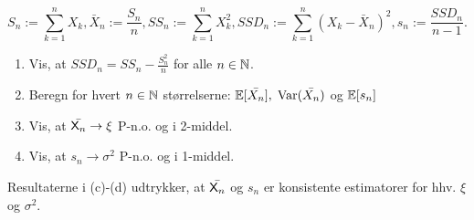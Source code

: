 \documentclass{Class}
\begin{document}
$$
S_n:=\sum_{k=1}^n X_k, \bar{X}_n:=\frac{S_n}{n}, S S_n:=\sum_{k=1}^n X_k^2, S S D_n:=\sum_{k=1}^n\left(X_k-\bar{X}_n\right)^2, s_n:=\frac{S S D_n}{n-1} .
$$
\begin{enumerate}
    \item Vis, at $SSD_n=SS_n-\frac{S^2_n}{n}$ for alle $n\in\mathbb{N}$.
    \item Beregn for hvert $n\in\mathbb{N}$ størrelserne: $\mathbb{E}[\bar{X_n}],\; \operatorname{Var}(\bar{X_n})$ og $\mathbb{E}[s_n]$
    \item Vis, at $\bar{\mathsf{X}_n}\rightarrow \xi$ P-n.o. og i 2-middel.
    \item Vis, at $s_n \rightarrow \sigma^2$ P-n.o. og i 1-middel.
\end{enumerate}
Resultaterne i (c)-(d) udtrykker, at $\bar{\mathsf{X}_n}$ og $s_n$ er konsistente estimatorer for hhv. $\xi$ og $\sigma^2$.
\solution
\end{document}
